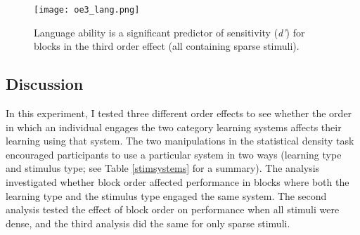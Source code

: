 \documentclass[../dissertation.tex]{subfiles}
\begin{document}
\begin{figure}[H]
\vspace{-10pt}
\texttt{[image: oe3\_lang.png]}
\caption[Relationship between language ability and accuracy for the third order effect]{Language ability is a significant predictor of sensitivity (\textit{d'}) for blocks in the third order effect (all containing sparse stimuli). }
\label{oe3_lang}
\vspace{-10pt}
\end{figure}	
	
\subsection{Discussion}

	In this experiment, I tested three different order effects to see whether the order in which an individual engages the two category learning systems affects their learning using that system. The two manipulations in the statistical density task encouraged participants to use a particular system in two ways (learning type and stimulus type; see Table \ref{stimsystems} for a summary). The analysis investigated whether block order affected performance in blocks where both the learning type and the stimulus type engaged the same system. The second analysis tested the effect of block order on performance when all stimuli were dense, and the third analysis did the same for only sparse stimuli. \par
	
\end{document}
